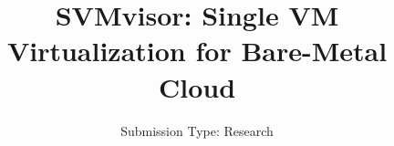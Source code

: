 \documentclass[10pt,twocolumn]{article}
\begin{document}
\title{SVMvisor: Single VM Virtualization for Bare-Metal Cloud}
\author{
\small Submission Type: Research
}
\date{}
\maketitle











\end{document}

